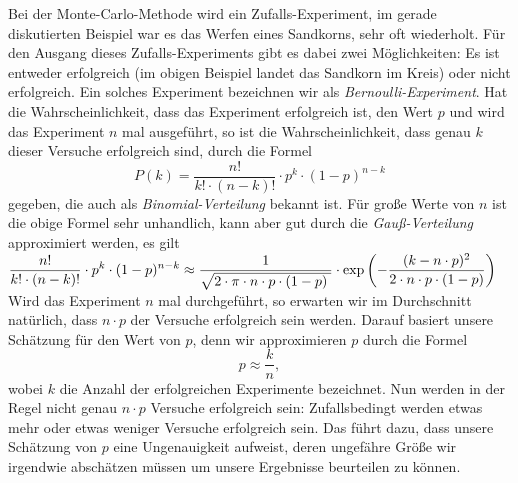 Bei der Monte-Carlo-Methode wird ein Zufalls-Experiment, im gerade diskutierten Beispiel war es das Werfen
eines Sandkorns, sehr oft wiederholt.  F\"ur den Ausgang dieses Zufalls-Experiments gibt es dabei zwei
M\"oglichkeiten:  Es ist ent\-weder erfolgreich (im obigen Beispiel landet das Sandkorn im Kreis) oder nicht
erfolgreich.  Ein solches Experiment bezeichnen wir als \emph{Bernoulli-Experiment}.
 Hat die Wahrscheinlichkeit, dass das Experiment erfolgreich ist, den Wert $p$ und wird das
Experiment $n$ mal ausgef\"uhrt, so ist die Wahrscheinlichkeit, dass genau $k$ dieser Versuche erfolgreich sind,
durch die Formel
\[ P(k) = \frac{n!}{k! \cdot (n-k)!} \cdot p^k \cdot (1-p)^{n-k} \]
gegeben, die auch als \emph{Binomial-Verteilung} bekannt ist.  F\"ur gro{\ss}e Werte von $n$ ist die obige Formel
sehr unhandlich, kann aber gut durch die \emph{Gau{\ss}-Verteilung} approximiert werden, es gilt
\\[0.2cm]
\hspace*{0.8cm}
$\displaystyle\frac{n!}{k! \cdot (n-k)!} \cdot p^k \cdot (1-p)^{n-k} \approx  
   \frac{1}{\sqrt{2\cdot \pi \cdot n \cdot p \cdot (1-p)\;}} \cdot 
   \exp\left(-\frac{(k - n \cdot p)^2}{2 \cdot n \cdot p \cdot (1 - p)}\right)
$
\\[0.2cm]
Wird das Experiment $n$ mal durchgef\"uhrt, so erwarten wir im Durchschnitt nat\"urlich, dass $n \cdot p$ der
Versuche erfolgreich sein werden.  Darauf basiert unsere Sch\"atzung f\"ur den Wert von $p$, denn wir approximieren
$p$ durch die Formel
\[ p \approx \frac{k}{n}, \]
wobei $k$ die Anzahl der erfolgreichen Experimente bezeichnet.  Nun werden in der Regel nicht genau $n \cdot p$
Versuche erfolgreich sein: Zufallsbedingt werden etwas mehr oder etwas weniger Versuche
erfolgreich sein.  Das f\"uhrt dazu, dass unsere Sch\"atzung von $p$ eine Ungenauigkeit aufweist, deren ungef\"ahre
Gr\"o{\ss}e wir irgendwie absch\"atzen m\"ussen um unsere Ergebnisse beurteilen zu k\"onnen.

